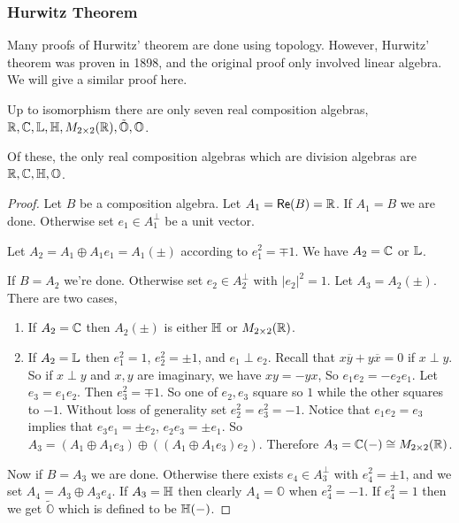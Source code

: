 \subsubsection{Hurwitz Theorem}
Many proofs of Hurwitz' theorem are done using topology. However, Hurwitz' theorem was proven in 1898, and the original proof only involved linear algebra. We will give a similar proof here. 
\begin{thm}
Up to isomorphism there are only seven real composition algebras, $\operatorname{\mathbb{R}},\operatorname{\mathbb{C}},\operatorname{\mathbb{L}},\operatorname{\mathbb{H}},M_{2\times 2}(\operatorname{\mathbb{R}}),\tilde{\mathbb{O}},\mathbb{O}$.

Of these, the only real composition algebras which are division algebras are $\operatorname{\mathbb{R}},\operatorname{\mathbb{C}},\operatorname{\mathbb{H}},\mathbb{O}$. 
\end{thm}
\begin{proof}
    Let $B$ be a composition algebra. Let $A_1 = \textsf{Re}(B)=\operatorname{\mathbb{R}}$. If $A_1=B$ we are done. Otherwise set $e_1\in A_1^\perp$ be a unit vector.

    Let $A_2 = A_1\oplus A_1e_1=A_1(\pm)$ according to $e_1^2 = \mp 1$. We have $A_2 = \operatorname{\mathbb{C}}$ or $\operatorname{\mathbb{L}}$.

    If $B=A_2$ we're done. Otherwise set $e_2\in A_2^\perp$ with $|e_2|^2=1$. Let $A_3=A_2(\pm)$. There are two cases,
    \begin{enumerate}[1.]
        \item {
        If $A_2=\operatorname{\mathbb{C}}$ then $A_2(\pm)$ is either $\operatorname{\mathbb{H}}$ or $M_{2\times 2}(\operatorname{\mathbb{R}})$.
        }\item {
        If $A_2=\operatorname{\mathbb{L}}$ then $e_1^2=1$, $e_2^2=\pm 1$, and $e_1\perp e_2$. Recall that $x\overline{y}+y\overline{x}=0$ if $x\perp y$. So if $x\perp y$ and $x,y$ are imaginary, we have $xy=-yx$, So $e_1e_2=-e_2e_1$. Let $e_3=e_1e_2$. Then $e_3^2=\mp 1$. So one of $e_2,e_3$ square so $1$ while the other squares to $-1$. Without loss of generality set $e_2^2=e_3^2=-1$. Notice that $e_1e_2=e_3$ implies that $e_3e_1=\pm e_2$, $e_2e_3=\pm e_1$. So $A_3=(A_1\oplus A_1e_3)\oplus ((A_1\oplus A_1e_3)e_2)$. Therefore $A_3= \operatorname{\mathbb{C}}(-)\cong M_{2\times 2}(\operatorname{\mathbb{R}})$.
        }
    \end{enumerate}

    Now if $B=A_3$ we are done. Otherwise there exists $e_4 \in A_3^\perp$ with $e_4^2 = \pm 1$, and we set $A_4 = A_3\oplus A_3e_4$. If $A_3=\operatorname{\mathbb{H}}$ then clearly $A_4=\mathbb{O}$ when $e_4^2=-1$. If $e_4^2=1$ then we get $\tilde{\mathbb{O}}$ which is defined to be $\operatorname{\mathbb{H}}(-)$.


\end{proof}
